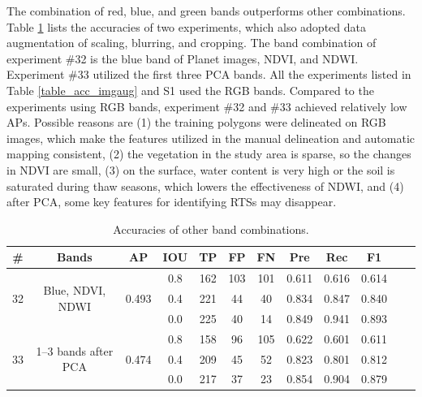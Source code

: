 \documentclass[authoryear,preprint,review,12pt]{elsarticle}
\begin{document}
The combination of red, blue, and green bands outperforms other combinations.
Table \ref{table_acc_otherbands} lists the accuracies of two experiments, which also adopted data augmentation of scaling, blurring, and cropping. The band combination of experiment \#32 is the blue band of Planet images, NDVI, and NDWI. Experiment \#33 utilized the first three PCA bands. All the experiments listed in Table \ref{table_acc_imgaug} and S1 used the RGB bands. Compared to the experiments using RGB bands, experiment \#32 and \#33 achieved relatively low APs. Possible reasons are (1) the training polygons were delineated on RGB images, which make the features utilized in the manual delineation and automatic mapping consistent, (2) the vegetation in the study area is sparse, so the changes in NDVI are small, (3) on the surface, water content is very high or the soil is saturated during thaw seasons, which lowers the effectiveness of NDWI, and (4) after PCA, some key features for identifying RTSs may disappear. 

\begin{table}[ht]
\footnotesize
\caption{Accuracies of other band combinations.}
\label{table_acc_otherbands}
\begin{tabular}{c c c c  c ccc c c c c}
\toprule
\textbf{\#}&\textbf{Bands}&\textbf{AP}&\textbf{IOU}&\textbf{TP}&\textbf{FP}&\textbf{FN}&\textbf{Pre}&\textbf{Rec}&\textbf{F1}\\
\midrule

\multirow{3}{*}{32} &  \multirow{3}{3cm}{Blue, NDVI, NDWI} & \multirow{3}{*}{0.493}  &0.8&162   & 103   & 101   & 0.611  & 0.616  & 0.614   \\
 &  &  &0.4&221   & 44    & 40    & 0.834  & 0.847  & 0.840 \\
 &  &  &0.0&225   & 40    & 14    & 0.849  & 0.941  & 0.893   \\
 
\midrule

\multirow{3}{*}{33} &  \multirow{3}{3cm}{1--3 bands after PCA} & \multirow{3}{*}{0.474} &0.8& 158   & 96    & 105   & 0.622  & 0.601  & 0.611  \\
 &  &  &0.4& 209   & 45    & 52    & 0.823  & 0.801  & 0.812  \\
 &  & &0.0& 217   & 37    & 23    & 0.854  & 0.904  & 0.879  \\

\bottomrule
\end{tabular}

\end{table}
\end{document}
